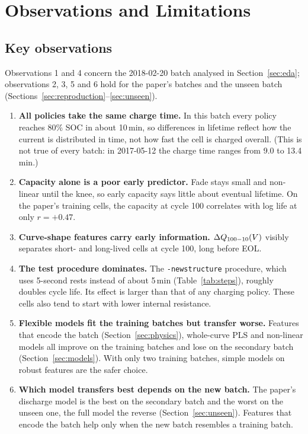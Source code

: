 \FloatBarrier
\section{Observations and Limitations}
\label{sec:discussion}

\subsection{Key observations}
Observations 1 and 4 concern the 2018-02-20 batch analysed in
Section~\ref{sec:eda}; observations 2, 3, 5 and 6 hold for the paper's
batches and the unseen batch (Sections~\ref{sec:reproduction}--\ref{sec:unseen}).
\begin{enumerate}
  \item \textbf{All policies take the same charge time.} In this batch every
  policy reaches 80\% SOC in about 10\,min, so differences in lifetime
  reflect how the current is distributed in time, not how fast the cell is
  charged overall. (This is not true of every batch: in 2017-05-12 the
  charge time ranges from 9.0 to 13.4\,min.)
  \item \textbf{Capacity alone is a poor early predictor.} Fade stays small
  and non-linear until the knee, so early capacity says little about
  eventual lifetime. On the paper's training cells, the capacity at cycle
  100 correlates with log life at only $r=+0.47$.
  \item \textbf{Curve-shape features carry early information.} $\Delta Q_{100-10}(V)$ visibly
  separates short- and long-lived cells at cycle 100, long before EOL.
  \item \textbf{The test procedure dominates.} The \texttt{-newstructure}
  procedure, which uses 5-second rests instead of about 5\,min
  (Table~\ref{tab:steps}), roughly doubles cycle life. Its effect is larger
  than that of any charging policy. These cells also tend to start with lower
  internal resistance.
  \item \textbf{Flexible models fit the training batches but transfer
  worse.} Features that encode the batch (Section~\ref{sec:physics}),
  whole-curve PLS and non-linear models all improve on the training batches
  and lose on the secondary batch (Section~\ref{sec:models}). With only two
  training batches, simple models on robust features are the safer choice.
  \item \textbf{Which model transfers best depends on the new batch.} The
  paper's discharge model is the best on the secondary batch and the worst on
  the unseen one, the full model the reverse (Section~\ref{sec:unseen}).
  Features that encode the batch help only when the new batch resembles a
  training batch.
\end{enumerate}

